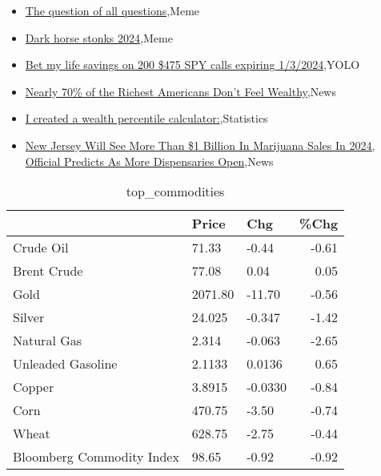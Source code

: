 \documentclass{article}%
\begin{document}
%
\begin{itemize}%
\item%
\href{https://reddit.com/r/wallstreetbets/comments/18ub8x3/the\_question\_of\_all\_questions/}{The question of all questions},Meme%
\item%
\href{https://reddit.com/r/wallstreetbets/comments/18u8mv2/dark\_horse\_stonks\_2024/}{Dark horse stonks 2024},Meme%
\item%
\href{https://reddit.com/r/wallstreetbets/comments/18u7xpb/bet\_my\_life\_savings\_on\_200\_475\_spy\_calls\_expiring/}{Bet my life savings on 200 \$475 SPY calls expiring 1/3/2024},YOLO%
\item%
\href{https://reddit.com/r/Economics/comments/18ucoi1/nearly\_70\_of\_the\_richest\_americans\_dont\_feel/}{Nearly 70\% of the Richest Americans Don't Feel Wealthy},News%
\item%
\href{https://reddit.com/r/Economics/comments/18tvur1/i\_created\_a\_wealth\_percentile\_calculator/}{I created a wealth percentile calculator:},Statistics%
\item%
\href{https://reddit.com/r/Economics/comments/18tuf9b/new\_jersey\_will\_see\_more\_than\_1\_billion\_in/}{New Jersey Will See More Than \$1 Billion In Marijuana Sales In 2024, Official Predicts As More Dispensaries Open},News%
\end{itemize}%


\begin{table}[htbp]%
\caption{top\_commodities}%
\centering%
\begin{adjustbox}{width=1\textwidth}%
\begin{tabular}{lllr}
\toprule
                          &   Price &     Chg &  \%Chg \\
\midrule
               Crude Oil  &   71.33 &   -0.44 & -0.61 \\
             Brent Crude  &   77.08 &    0.04 &  0.05 \\
                    Gold  & 2071.80 &  -11.70 & -0.56 \\
                  Silver  &  24.025 &  -0.347 & -1.42 \\
             Natural Gas  &   2.314 &  -0.063 & -2.65 \\
       Unleaded Gasoline  &  2.1133 &  0.0136 &  0.65 \\
                  Copper  &  3.8915 & -0.0330 & -0.84 \\
                    Corn  &  470.75 &   -3.50 & -0.74 \\
                   Wheat  &  628.75 &   -2.75 & -0.44 \\
Bloomberg Commodity Index &   98.65 &   -0.92 & -0.92 \\
\bottomrule
\end{tabular}
%
\end{adjustbox}%
\end{table}
\end{document}
